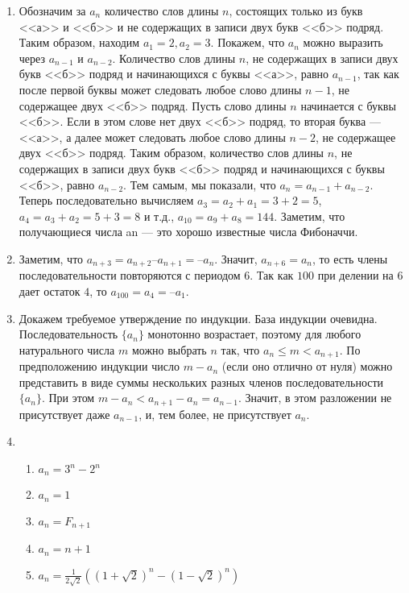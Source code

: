 \documentclass[14pt,openany]{book}
\begin{document}
\begin{enumerate}
\begin{enumerate}
 \end{enumerate}

\item Обозначим за $a_n$ количество слов длины $n$, состоящих только из букв <<а>> и <<б>> и не содержащих в записи двух букв <<б>> подряд. Таким образом, находим $a_1=2, a_2=3$. Покажем, что $a_n$ можно выразить через $a_{n-1}$ и $a_{n-2}$. Количество слов длины $n$, не содержащих в записи двух букв <<б>> подряд и начинающихся с буквы <<а>>, равно $a_{n-1}$, так как после первой буквы может следовать любое слово длины $n-1$, не содержащее двух <<б>> подряд. Пусть слово длины $n$ начинается с буквы <<б>>. Если в этом слове нет двух <<б>> подряд, то вторая буква --- <<а>>, а далее может следовать любое слово длины $n-2$, не содержащее двух <<б>> подряд. Таким образом, количество слов длины $n$, не содержащих в записи двух букв <<б>> подряд и начинающихся с буквы <<б>>, равно $a_{n-2}$. Тем самым, мы показали, что $a_n=a_{n-1}+a_{n-2}$. Теперь последовательно вычисляем $a_3=a_2+a_1=3+2=5$, $a_4=a_3+a_2=5+3=8$ и т.д., $a_{10}=a_9+a_8=144$. Заметим, что получающиеся числа an --- это хорошо известные числа Фибоначчи. 

\item Заметим, что  $a_{n+3} = a_{n+2} – a_{n+1} = –a_n$.  Значит,  $a_{n+6} = a_n$,  то есть члены последовательности повторяются с периодом $6$. Так как $100$ при делении на $6$ дает остаток $4$, то  $a_{100} = a_4 = –a_1$.

\item Докажем требуемое утверждение по индукции. База индукции очевидна. Последовательность $\{a_n\}$ монотонно возрастает, поэтому для любого натурального числа $m$ можно выбрать $n$ так, что 
$a_n \le m < a_{n+1}$. По предположению индукции число $m - a_n$ (если оно отлично от нуля) можно представить в виде суммы нескольких разных членов последовательности $\{a_n\}$. При этом 
$m - a_n < a_{n + 1} - a_n = a_{n - 1}$. Значит, в этом разложении не присутствует даже 
$a_{n - 1}$, и, тем более, не присутствует $a_n$. 

\item 
  \begin{enumerate}
    \item $a_n = 3^n - 2^n$
    \item $a_n = 1$
    \item $a_n = F_{n+1}$
    \item $a_n = n + 1$
    \item $a_n = \frac{1}{2\sqrt{2}}\left(\left(1+\sqrt{2}\right)^n - \left(1-\sqrt{2}\right)^n\right)$
  \end{enumerate}


\end{enumerate}
\end{document}
